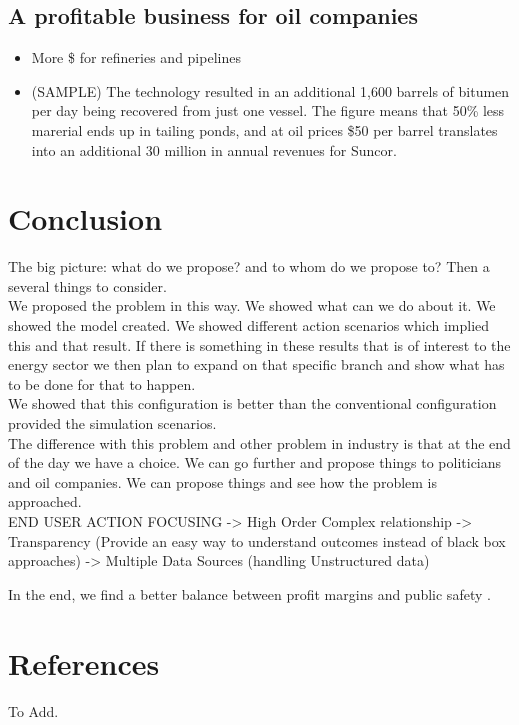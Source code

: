 \documentclass[12pt]{article}
\begin{document}
\subsection{A profitable business for oil companies}
\begin{itemize}
\item More \$ for refineries and pipelines
\item (SAMPLE) The technology resulted in an additional 1,600 barrels of bitumen per day being recovered from just one vessel. The figure means that 50\% less marerial ends up in tailing ponds, and at oil prices \$50 per barrel translates into an additional 30 million in annual revenues for Suncor. 
\end{itemize}

\section{Conclusion}
The big picture: what do we propose? and to whom do we propose to? Then a several things to consider. \\

We proposed the problem in this way. We showed what can we do about it. We showed the model created. We showed different action scenarios which implied this and that result. If there is something in these results that is of interest to the energy sector we then plan to expand on that specific branch and show what has to be done for that to happen.\\  

We showed that this configuration is better than the conventional configuration provided the simulation scenarios. \\

The difference with this problem and other problem in industry is that at the end of the day we have a choice. We can go further and propose things to politicians and oil companies. We can propose things and see how the problem is approached. \\

END USER ACTION FOCUSING -> High Order Complex relationship -> Transparency (Provide an easy way to understand outcomes  instead of black box approaches) -> Multiple Data Sources (handling Unstructured data) 

In the end, we find a better balance between profit margins and public safety . 

\newpage
\section*{References}
To Add. 
\end{document}
